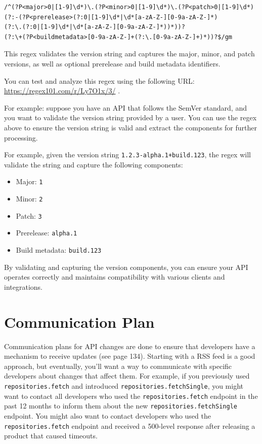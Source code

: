 \documentclass{article}
\begin{document}
\begin{verbatim}
/^(?P<major>0|[1-9]\d*)\.(?P<minor>0|[1-9]\d*)\.(?P<patch>0|[1-9]\d*)
(?:-(?P<prerelease>(?:0|[1-9]\d*|\d*[a-zA-Z-][0-9a-zA-Z-]*)
(?:\.(?:0|[1-9]\d*|\d*[a-zA-Z-][0-9a-zA-Z-]*))*))?
(?:\+(?P<buildmetadata>[0-9a-zA-Z-]+(?:\.[0-9a-zA-Z-]+)*))?$/gm
\end{verbatim}

This regex validates the version string and captures the major, minor, and patch versions, as well as optional prerelease and build metadata identifiers.

You can test and analyze this regex using the following URL: \url{https://regex101.com/r/Ly7O1x/3/} .

For example: suppose you have an API that follows the SemVer standard, and you want to validate the version string provided by a user. You can use the regex above to ensure the version string is valid and extract the components for further processing.

For example, given the version string \texttt{1.2.3-alpha.1+build.123}, the regex will validate the string and capture the following components:

\begin{itemize}
    \item Major: \texttt{1}
    \item Minor: \texttt{2}
    \item Patch: \texttt{3}
    \item Prerelease: \texttt{alpha.1}
    \item Build metadata: \texttt{build.123}
\end{itemize}

By validating and capturing the version components, you can ensure your API operates correctly and maintains compatibility with various clients and integrations.

\section{Communication Plan}

Communication plans for API changes are done to ensure that developers have a mechanism to receive updates (see \cite{DesigningWebAPIs} page 134). Starting with a RSS feed is a good approach, but eventually, you'll want a way to communicate with specific developers about changes that affect them. For example, if you previously used \texttt{repositories.fetch} and introduced \texttt{repositories.fetchSingle}, you might want to contact all developers who used the \texttt{repositories.fetch} endpoint in the past 12 months to inform them about the new \texttt{repositories.fetchSingle} endpoint. You might also want to contact developers who used the \texttt{repositories.fetch} endpoint and received a 500-level response after releasing a product that caused timeouts.
\end{document}
